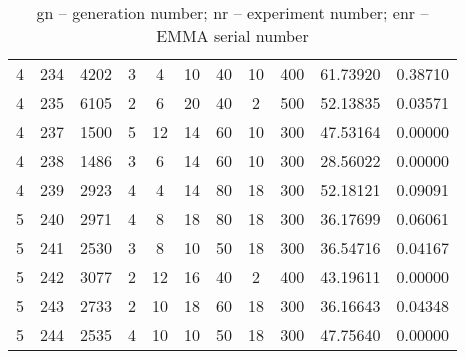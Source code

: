 \begin{table}[ht]
\begin{tabular}{ccc|cccccc|cc}
        4   &234	&4202	&3	&4	&10	&40	&10	&400	&61.73920	&0.38710\\
        4   &235	&6105	&2	&6	&20	&40	&2	&500	&52.13835	&0.03571\\
        4   &237	&1500	&5	&12	&14	&60	&10	&300	&47.53164	&0.00000\\
        4   &238	&1486	&3	&6	&14	&60	&10	&300	&28.56022	&0.00000\\
        4   &239	&2923	&4	&4	&14	&80	&18	&300	&52.18121	&0.09091\\
                                                                           
        5   &240	&2971	&4	&8	&18	&80	&18	&300	&36.17699	&0.06061\\
        5   &241	&2530	&3	&8	&10	&50	&18	&300	&36.54716	&0.04167\\
        5   &242	&3077	&2	&12	&16	&40	&2	&400	&43.19611	&0.00000\\
        5   &243	&2733	&2	&10	&18	&60	&18	&300	&36.16643	&0.04348\\
        5   &244	&2535	&4	&10	&10	&50	&18	&300	&47.75640	&0.00000\\
    \hline\hline
	\end{tabular}
    \caption{
        gn -- generation number; 
        nr -- experiment number; 
        enr -- EMMA serial number} 
\end{table}

